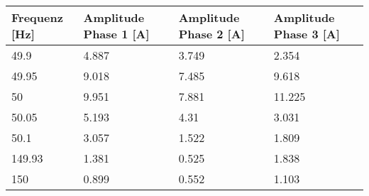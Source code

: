 \begin{table}[ht]
	\centering
	\begin{tabular}{|l|l|l|l|}
		\hline
		Frequenz {[}Hz{]} & Amplitude Phase 1 {[}A{]}                                                           & Amplitude Phase 2 {[}A{]}                                                           & Amplitude Phase 3 {[}A{]}                                                           \\ \hline
		49.9              & 4.887                                                                               & 3.749                                                                               & 2.354                                                                               \\ \hline
		49.95             & 9.018                                                                               & 7.485                                                                               & 9.618                                                                               \\ \hline
		50                & 9.951                                                                               & 7.881                                                                               & 11.225                                                                              \\ \hline
		50.05             & 5.193                                                                               & 4.31                                                                                & 3.031                                                                               \\ \hline
		50.1              & 3.057                                                                               & 1.522                                                                               & 1.809                                                                               \\ \hline
		149.93            & 1.381                                                                               & 0.525                                                                               & 1.838                                                                               \\ \hline
		150               & 0.899                                                                               & 0.552                                                                               & 1.103                                                                               \\ \hline

\end{tabular}
\end{table}
